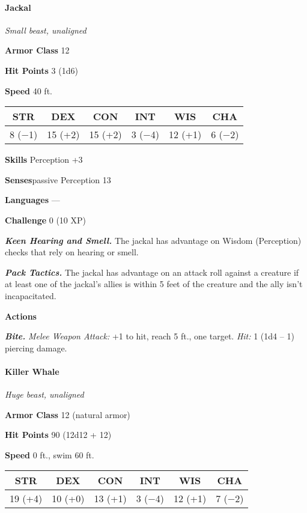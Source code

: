 \documentclass[
]{article}
\begin{document}
\hypertarget{jackal}{%
\paragraph{Jackal}\label{jackal}}

\emph{Small beast, unaligned}

\textbf{Armor Class} 12

\textbf{Hit Points} 3 (1d6)

\textbf{Speed} 40 ft.

\begin{longtable}[]{@{}cccccc@{}}
\toprule
STR & DEX & CON & INT & WIS & CHA\tabularnewline
\midrule
\endhead
8 (−1) & 15 (+2) & 15 (+2) & 3 (−4) & 12 (+1) & 6 (−2)\tabularnewline
\bottomrule
\end{longtable}

\textbf{Skills} Perception +3

\textbf{Senses}passive Perception 13

\textbf{Languages} ---

\textbf{Challenge} 0 (10 XP)

\emph{\textbf{Keen Hearing and Smell.}} The jackal has advantage on
Wisdom (Perception) checks that rely on hearing or smell.

\emph{\textbf{Pack Tactics.}} The jackal has advantage on an attack roll
against a creature if at least one of the jackal's allies is within 5
feet of the creature and the ally isn't incapacitated.

\textbf{Actions}

\emph{\textbf{Bite.}} \emph{Melee Weapon Attack:} +1 to hit, reach 5
ft., one target. \emph{Hit:} 1 (1d4 -- 1) piercing damage.

\hypertarget{killer-whale}{%
\paragraph{Killer Whale}\label{killer-whale}}

\emph{Huge beast, unaligned}

\textbf{Armor Class} 12 (natural armor)

\textbf{Hit Points} 90 (12d12 + 12)

\textbf{Speed} 0 ft., swim 60 ft.

\begin{longtable}[]{@{}cccccc@{}}
\toprule
STR & DEX & CON & INT & WIS & CHA\tabularnewline
\midrule
\endhead
19 (+4) & 10 (+0) & 13 (+1) & 3 (−4) & 12 (+1) & 7 (−2)\tabularnewline
\bottomrule
\end{longtable}
\end{document}
